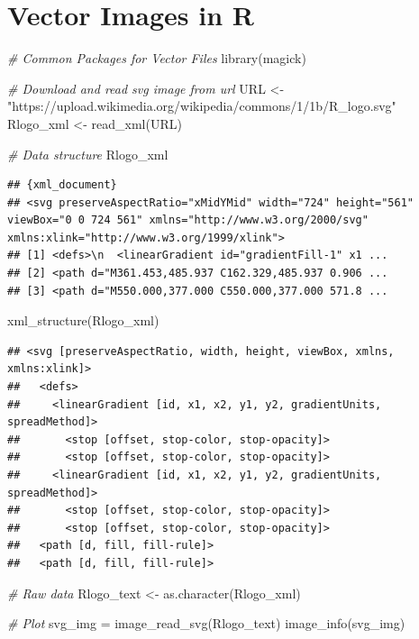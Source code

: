 \documentclass[
  12pt,
]{style/krantz}
\newenvironment{Shaded}{\begin{snugshade}}{\end{snugshade}}
\newcommand{\CommentTok}[1]{\textcolor[rgb]{0.56,0.35,0.01}{\textit{#1}}}
\newcommand{\FunctionTok}[1]{\textcolor[rgb]{0.00,0.00,0.00}{#1}}
\newcommand{\NormalTok}[1]{#1}
\newcommand{\OtherTok}[1]{\textcolor[rgb]{0.56,0.35,0.01}{#1}}
\newcommand{\StringTok}[1]{\textcolor[rgb]{0.31,0.60,0.02}{#1}}
\begin{document}
\hypertarget{vector-images-in-r}{%
\section{Vector Images in R}\label{vector-images-in-r}}

\begin{Shaded}
\begin{Highlighting}[]
\CommentTok{\# Common Packages for Vector Files}
\FunctionTok{library}\NormalTok{(magick)}

\CommentTok{\# Download and read svg image from url}
\NormalTok{URL }\OtherTok{\textless{}{-}} \StringTok{"https://upload.wikimedia.org/wikipedia/commons/1/1b/R\_logo.svg"}
\NormalTok{Rlogo\_xml }\OtherTok{\textless{}{-}} \FunctionTok{read\_xml}\NormalTok{(URL)}

\CommentTok{\# Data structure}
\NormalTok{Rlogo\_xml }
\end{Highlighting}
\end{Shaded}

\begin{verbatim}
## {xml_document}
## <svg preserveAspectRatio="xMidYMid" width="724" height="561" viewBox="0 0 724 561" xmlns="http://www.w3.org/2000/svg" xmlns:xlink="http://www.w3.org/1999/xlink">
## [1] <defs>\n  <linearGradient id="gradientFill-1" x1 ...
## [2] <path d="M361.453,485.937 C162.329,485.937 0.906 ...
## [3] <path d="M550.000,377.000 C550.000,377.000 571.8 ...
\end{verbatim}

\begin{Shaded}
\begin{Highlighting}[]
\FunctionTok{xml\_structure}\NormalTok{(Rlogo\_xml)}
\end{Highlighting}
\end{Shaded}

\begin{verbatim}
## <svg [preserveAspectRatio, width, height, viewBox, xmlns, xmlns:xlink]>
##   <defs>
##     <linearGradient [id, x1, x2, y1, y2, gradientUnits, spreadMethod]>
##       <stop [offset, stop-color, stop-opacity]>
##       <stop [offset, stop-color, stop-opacity]>
##     <linearGradient [id, x1, x2, y1, y2, gradientUnits, spreadMethod]>
##       <stop [offset, stop-color, stop-opacity]>
##       <stop [offset, stop-color, stop-opacity]>
##   <path [d, fill, fill-rule]>
##   <path [d, fill, fill-rule]>
\end{verbatim}

\begin{Shaded}
\begin{Highlighting}[]
\CommentTok{\# Raw data}
\NormalTok{Rlogo\_text }\OtherTok{\textless{}{-}} \FunctionTok{as.character}\NormalTok{(Rlogo\_xml)}

\CommentTok{\# Plot}
\NormalTok{svg\_img }\OtherTok{=} \FunctionTok{image\_read\_svg}\NormalTok{(Rlogo\_text)}
\FunctionTok{image\_info}\NormalTok{(svg\_img)}
\end{Highlighting}
\end{Shaded}
\end{document}

